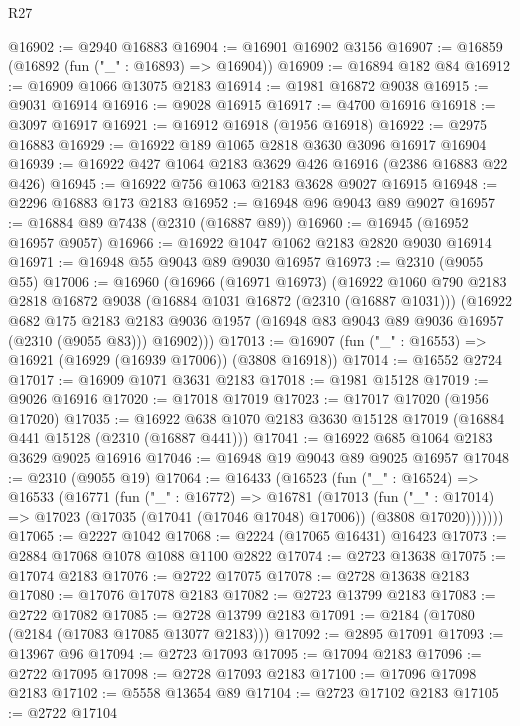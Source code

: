 \begin{lexlean}{R27}
\begin{coremodule}
@16902 := @2940 @16883
@16904 := @16901 @16902 @3156
@16907 := @16859 (@16892 (fun ("_" : @16893) => @16904))
@16909 := @16894 @182 @84
@16912 := @16909 @1066 @13075 @2183
@16914 := @1981 @16872 @9038
@16915 := @9031 @16914
@16916 := @9028 @16915
@16917 := @4700 @16916
@16918 := @3097 @16917
@16921 := @16912 @16918 (@1956 @16918)
@16922 := @2975 @16883
@16929 := @16922 @189 @1065 @2818 @3630 @3096 @16917 @16904
@16939 := @16922 @427 @1064 @2183 @3629 @426 @16916 (@2386 @16883 @22 @426)
@16945 := @16922 @756 @1063 @2183 @3628 @9027 @16915
@16948 := @2296 @16883 @173 @2183
@16952 := @16948 @96 @9043 @89 @9027
@16957 := @16884 @89 @7438 (@2310 (@16887 @89))
@16960 := @16945 (@16952 @16957 @9057)
@16966 := @16922 @1047 @1062 @2183 @2820 @9030 @16914
@16971 := @16948 @55 @9043 @89 @9030 @16957
@16973 := @2310 (@9055 @55)
@17006 := @16960
    (@16966
      (@16971 @16973)
      (@16922
        @1060
        @790
        @2183
        @2818
        @16872
        @9038
        (@16884 @1031 @16872 (@2310 (@16887 @1031)))
        (@16922
          @682
          @175
          @2183
          @2183
          @9036
          @1957
          (@16948 @83 @9043 @89 @9036 @16957 (@2310 (@9055 @83)))
          @16902)))
@17013 := @16907 (fun ("_" : @16553) => @16921 (@16929 (@16939 @17006)) (@3808 @16918))
@17014 := @16552 @2724
@17017 := @16909 @1071 @3631 @2183
@17018 := @1981 @15128
@17019 := @9026 @16916
@17020 := @17018 @17019
@17023 := @17017 @17020 (@1956 @17020)
@17035 := @16922 @638 @1070 @2183 @3630 @15128 @17019 (@16884 @441 @15128 (@2310 (@16887 @441)))
@17041 := @16922 @685 @1064 @2183 @3629 @9025 @16916
@17046 := @16948 @19 @9043 @89 @9025 @16957
@17048 := @2310 (@9055 @19)
@17064 := @16433
    (@16523
      (fun ("_" : @16524) =>
      @16533
        (@16771
          (fun ("_" : @16772) =>
          @16781
            (@17013
              (fun ("_" : @17014) =>
              @17023 (@17035 (@17041 (@17046 @17048) @17006)) (@3808 @17020)))))))
@17065 := @2227 @1042
@17068 := @2224 (@17065 @16431) @16423
@17073 := @2884 @17068 @1078 @1088 @1100 @2822
@17074 := @2723 @13638
@17075 := @17074 @2183
@17076 := @2722 @17075
@17078 := @2728 @13638 @2183
@17080 := @17076 @17078 @2183
@17082 := @2723 @13799 @2183
@17083 := @2722 @17082
@17085 := @2728 @13799 @2183
@17091 := @2184 (@17080 (@2184 (@17083 @17085 @13077 @2183)))
@17092 := @2895 @17091
@17093 := @13967 @96
@17094 := @2723 @17093
@17095 := @17094 @2183
@17096 := @2722 @17095
@17098 := @2728 @17093 @2183
@17100 := @17096 @17098 @2183
@17102 := @5558 @13654 @89
@17104 := @2723 @17102 @2183
@17105 := @2722 @17104

\end{coremodule}
\end{lexlean}
